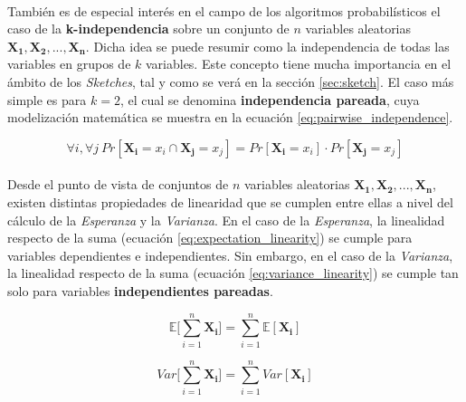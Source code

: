 \documentclass{subfiles}
\begin{document}
        \paragraph{}
        También es de especial interés en el campo de los algoritmos probabilísticos el caso de la \textbf{k-independencia} sobre un conjunto de $n$ variables aleatorias $\boldsymbol{X_1}, \boldsymbol{X_2},..., \boldsymbol{X_n}$. Dicha idea se puede resumir como la independencia de todas las variables en grupos de $k$ variables. Este concepto tiene mucha importancia en el ámbito de los \emph{Sketches}, tal y como se verá en la sección \ref{sec:sketch}. El caso más simple es para $k = 2$, el cual se denomina \textbf{independencia pareada}, cuya modelización matemática se muestra en la ecuación \eqref{eq:pairwise_independence}.

        \begin{equation}
        \label{eq:pairwise_independence}
          \forall i, \forall j \ Pr[\boldsymbol{X_i} = x_i \cap \boldsymbol{X_j} = x_j] = Pr[\boldsymbol{X_i} = x_i] \cdot Pr[\boldsymbol{X_j} = x_j]
        \end{equation}

        \paragraph{}
        Desde el punto de vista de conjuntos de $n$ variables aleatorias  $\boldsymbol{X_1}, \boldsymbol{X_2},..., \boldsymbol{X_n}$, existen distintas propiedades de linearidad que se cumplen entre ellas a nivel del cálculo de la \emph{Esperanza} y la \emph{Varianza}. En el caso de la \emph{Esperanza}, la linealidad respecto de la suma (ecuación \eqref{eq:expectation_linearity}) se cumple para variables dependientes e independientes. Sin embargo, en el caso de la \emph{Varianza}, la linealidad respecto de la suma (ecuación \eqref{eq:variance_linearity}) se cumple tan solo para variables \textbf{independientes pareadas}.

        \begin{equation}
        \label{eq:expectation_linearity}
          \mathbb{E}\bigg[\sum_{i=1}^n \boldsymbol{X_i}\bigg] = \sum_{i=1}^n \mathbb{E}[\boldsymbol{X_i}]
        \end{equation}

        \begin{equation}
        \label{eq:variance_linearity}
          Var\bigg[\sum_{i=1}^n \boldsymbol{X_i}\bigg] = \sum_{i=1}^n Var[\boldsymbol{X_i}]
        \end{equation}
\end{document}
